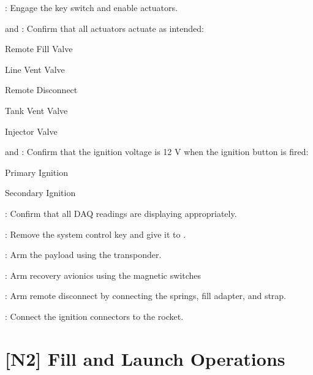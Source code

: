 \begin{checklist}
    \item \control{}: Engage the key switch and enable actuators.
    \item \control{} and \secondary: Confirm that all actuators actuate as intended:
    \begin{checklist}
        \item Remote Fill Valve
        \item Line Vent Valve
        \item Remote Disconnect
        \item Tank Vent Valve
        \item Injector Valve
    \end{checklist}
    \item \control{} and \secondary: Confirm that the ignition voltage is 12 V when the ignition button is fired:
    \begin{checklist}
        \item Primary Ignition
        \item Secondary Ignition
    \end{checklist}
    \item \control: Confirm that all DAQ readings are displaying appropriately.
    \item \control: Remove the system control key and give it to \ops.
    \item \primary: Arm the payload using the transponder.
    \item \primary: Arm recovery avionics using the magnetic switches
    \item \primary: Arm remote disconnect by connecting the springs, fill adapter, and strap.
    \item \primary: Connect the ignition connectors to the rocket.
\end{checklist}
\setcounter{checklistnum}{0}
\newpage

\section{[N2] Fill and Launch Operations} 
